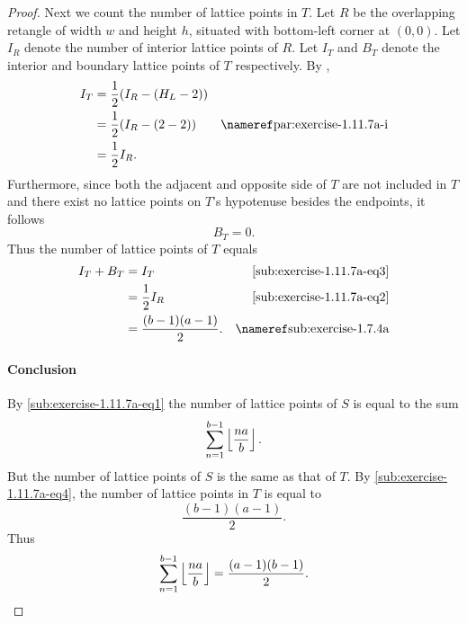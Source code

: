 \documentclass{report}
\begin{document}
\begin{proof}
    Next we count the number of lattice points in $T$.
    Let $R$ be the overlapping retangle of width $w$ and height $h$, situated
      with bottom-left corner at $(0, 0)$.
    Let $I_R$ denote the number of interior lattice points of $R$.
    Let $I_T$ and $B_T$ denote the interior and boundary lattice points of $T$
      respectively.
    By ,
      \begin{align}
        I_T
          & = \frac{1}{2}(I_R - (H_L - 2)) \nonumber \\
          & = \frac{1}{2}(I_R - (2 - 2))
            & \textref{par:exercise-1.11.7a-i} \nonumber \\
          & = \frac{1}{2}I_R. & \label{sub:exercise-1.11.7a-eq2}
      \end{align}
    Furthermore, since both the adjacent and opposite side of $T$ are not
      included in $T$ and there exist no lattice points on $T$'s hypotenuse
      besides the endpoints, it follows
      \begin{equation}
        \label{sub:exercise-1.11.7a-eq3}
        B_T = 0.
      \end{equation}
    Thus the number of lattice points of $T$ equals
      \begin{align}
        I_T + B_T
          & = I_T & \eqref{sub:exercise-1.11.7a-eq3} \nonumber \\
          & = \frac{1}{2}I_R & \eqref{sub:exercise-1.11.7a-eq2} \nonumber \\
          & = \frac{(b - 1)(a - 1)}{2}.
            & \textref{sub:exercise-1.7.4a} \label{sub:exercise-1.11.7a-eq4}
      \end{align}

  \paragraph{Conclusion}%

    By \eqref{sub:exercise-1.11.7a-eq1} the number of lattice points of $S$ is
      equal to the sum $$\sum_{n=1}^{b-1} \left\lfloor\frac{na}{b}\right\rfloor.$$
    But the number of lattice points of $S$ is the same as that of $T$.
    By \eqref{sub:exercise-1.11.7a-eq4}, the number of lattice points in $T$ is
      equal to $$\frac{(b - 1)(a - 1)}{2}.$$
    Thus $$\sum_{n=1}^{b-1} \left\lfloor\frac{na}{b}\right\rfloor = \frac{(a - 1)(b - 1)}{2}.$$

\end{proof}

\subsection{}%
\label{sub:exercise-1.11.7b}
\end{document}
